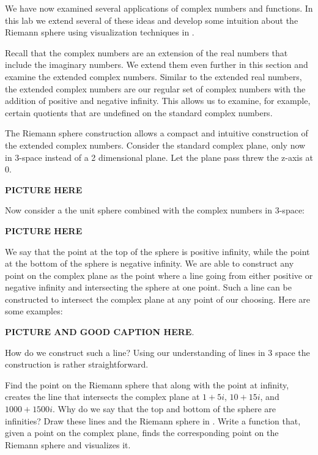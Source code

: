 

We have now examined several applications of complex numbers and functions.  In this lab we extend several of these ideas and develop some intuition about the Riemann sphere using visualization techniques in \ProgrammingLanguage.

Recall that the complex numbers are an extension of the real numbers that include the imaginary numbers.  We extend them even further in this section and examine the extended complex numbers.  Similar to the extended real numbers, the extended complex numbers are our regular set of complex numbers with the addition of positive and negative infinity.  This allows us to examine, for example, certain quotients that are undefined on the standard complex numbers.

The Riemann sphere construction allows a compact and intuitive construction of the extended complex numbers.  Consider the standard complex plane, only now in 3-space instead of a 2 dimensional plane.  Let the plane pass threw the z-axis at $0$.

{\bf PICTURE HERE}

Now consider a the unit sphere combined with the complex numbers in 3-space:

{\bf PICTURE HERE}

We say that the point at the top of the sphere is positive infinity, while the point at the bottom of the sphere is negative infinity.  We are able to construct any point on the complex plane as the point where a line going from either positive or negative infinity and intersecting the sphere at one point.  Such a line can be constructed to intersect the complex plane at any point of our choosing.  Here are some examples:

{\bf PICTURE AND GOOD CAPTION HERE}.

How do we construct such a line?  Using our understanding of lines in 3 space the construction is rather straightforward.

\begin{problem}  Find the point on the Riemann sphere that along with the point at infinity, creates the line that intersects the complex plane at $1 + 5i$, $10 + 15i$, and $1000 + 1500i$.  Why do we say that the top and bottom of the sphere are infinities?  Draw these lines and the Riemann sphere in \ProgrammingLanguage.  Write a function that, given a point on the complex plane, finds the corresponding point on the Riemann sphere and visualizes it.
\end{problem}

